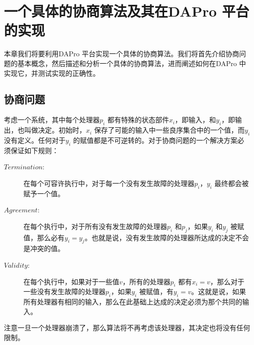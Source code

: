 \chapter{一个具体的协商算法及其在DAPro 平台的实现}
    本章我们将要利用DAPro 平台实现一个具体的协商算法\cite{fischer1983consensus}。我们将首先介绍协商问题的基本概念，然后描述和分析一个具体的协商算法，进而阐述如何在DAPro 中实现它，并测试实现的正确性。

    \section{协商问题}
    考虑一个系统，其中每个处理器$p_i$ 都有特殊的状态部件$x_i$，即输入，和$y_i$，即输出，也叫做决定。初始时，$x_i$ 保存了可能的输入中一些良序集合中的一个值，而$y_i$ 没有定义。任何对于$y_i$ 的赋值都是不可逆转的。对于协商问题的一个解决方案必须保证如下规则：
    \begin{description}
      \item[$Termination:$] 在每个可容许执行中，对于每一个没有发生故障的处理器$p_i$，$y_i$ 最终都会被赋予一个值。
      \item[$Agreement:$] 在每个执行中，对于所有没有发生故障的处理器$p_i$ 和$p_j$，如果$y_i$ 和$y_j$ 被赋值，那么必有$y_i=y_j$。也就是说，没有发生故障的处理器所达成的决定不会是冲突的值。
      \item[$Validity:$] 在每个执行中，如果对于一些值$v$，所有的处理器$p_i$ 都有$x_i=v$，那么对于一些没有发生故障的处理器$p_i$，如果$y_i$ 被赋值，有$y_i=v$。这就是说，如果所有处理器有相同的输入，那么在此基础上达成的决定必须为那个共同的输入。
    \end{description}

    注意一旦一个处理器崩溃了，那么算法将不再考虑该处理器，其决定也将没有任何限制\cite{attiya2004distributed}。


